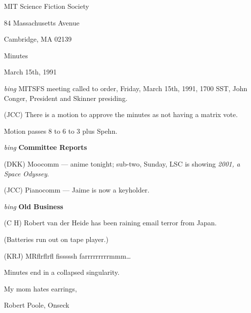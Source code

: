 \setlength{\topmargin}{-0.5in}
\setlength{\oddsidemargin}{0.0in}
\setlength{\evensidemargin}{0.0in}
\setlength{\textheight}{9in}
\setlength{\textwidth}{6.5in}



\begin{center}
MIT Science Fiction Society

84 Massachusetts Avenue

Cambridge, MA 02139

\vspace{0.2in}
Minutes

March 15th, 1991

\end{center}

\vspace{0.15in}
{\em bing\/}  MITSFS meeting called to order, Friday, March 15th, 1991,
1700 SST, John Conger, President and Skinner presiding.

(JCC) There is a motion to approve the minutes as not having a matrix vote.

Motion passes 8 to 6 to 3 plus Spehn.

\vspace{0.15in}
{\em bing\/} {\bf Committee Reports\/}

(DKK) Moocomm --- anime tonight; sub-two, Sunday, LSC is showing {\em 2001,
a Space Odyssey}.

(JCC) Pianocomm --- Jaime is now a keyholder.

\vspace{.15in}
{\em bing\/} {\bf Old Business\/}

(C H) Robert van der Heide has been raining email terror from Japan.

(Batteries run out on tape player.)

(KRJ) MRflrflrfl fisssssh farrrrrrrrrmmm\ldots

Minutes end in a collapsed singularity.

\vspace{0.15in}
\begin{center}
My mom hates earrings,

Robert Poole, Onseck
\end{center}


